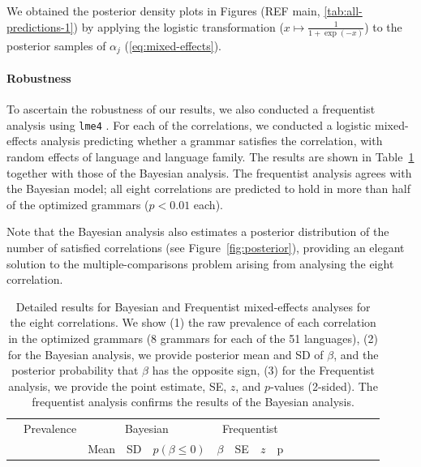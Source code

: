 \documentclass[10pt,twoside,lineno]{article}
\begin{document}
We obtained the posterior density plots in Figures (REF main, \ref{tab:all-predictions-1}) by applying the logistic transformation ($x \mapsto \frac{1}{1+\exp(-x)}$) to the posterior samples of $\alpha_j$ (\ref{eq:mixed-effects}).





\paragraph{Robustness}
To ascertain the robustness of our results, we also conducted a frequentist analysis using \texttt{lme4} \cite{bates2015fitting}.
For each of the correlations, we conducted a logistic mixed-effects analysis predicting whether a grammar satisfies the correlation, with random effects of language and language family.
The results are shown in Table~\ref{tab:corr-regression} together with those of the Bayesian analysis.
The frequentist analysis agrees with the Bayesian model; all eight correlations are predicted to hold in more than half of the optimized grammars ($p < 0.01$ each).

Note that the Bayesian analysis  also estimates a posterior distribution of the number of satisfied correlations (see Figure~\ref{fig:posterior}), providing an elegant solution to the multiple-comparisons problem arising from analysing the eight correlation.





\begin{table}
\small{
\begin{center}
\begin{tabular}{l||l|lll|llll|ll|llllll}
 & Prevalence & \multicolumn{3}{c|}{Bayesian} & \multicolumn{4}{c|}{Frequentist} \\ 
& & Mean & SD & $p(\beta \leq 0)$ & $\beta$ & SE & $z$ & p \\
\hline\hline
	
\end{tabular}
\end{center}
}
	\caption{Detailed results for Bayesian and Frequentist mixed-effects analyses for the eight correlations. 
We show (1) the raw prevalence of each correlation in the optimized grammars (8 grammars for each of the 51 languages),
(2) for the Bayesian analysis, we provide posterior mean and SD of $\beta$, and the posterior probability that $\beta$ has the opposite sign,
(3) for the Frequentist analysis, we provide the point estimate, SE, $z$, and $p$-values (2-sided).
The frequentist analysis confirms the results of the Bayesian analysis.
}\label{tab:corr-regression}
\end{table}
\end{document}
